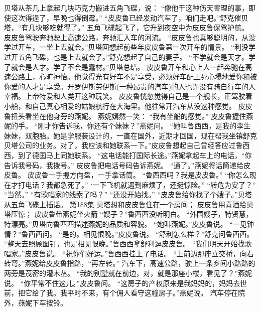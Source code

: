 \documentclass[a4paper,12pt,UTF8,twoside]{ctexbook}
\begin{document}
        贝塔从茶几上拿起几块巧克力搬进五角飞碟，说： 
        “像他干这种伤天害理的事，即使这次得逞了，早晚也得倒霉。” 
        “皮皮鲁已经发动汽车了，咱们走吧。”舒克催贝塔，“有几块够吃就得了。” 
        五角飞碟起飞了，它升到夜空中为皮皮鲁保驾护航。 
        皮皮鲁驾驶奔驰驶上高速公路，奔驰汇入车的河流。 
        “皮皮鲁也真够聪明的，从没学过开车，一坐上去就会。”贝塔回想起前些年皮皮鲁第一次开车的情景。 
        “利没学过开五角飞碟，也是上去就会了。”舒克想起了自己的妻子。 
        “不学就会是天才。学了就会是人才。学了不会是蠢材。”贝塔总结。 
        皮皮鲁开车和心上人一起奔驰在高速公路上，心旷神怡。他觉得光有好车不是享受，必须好车配上死心塌地爱你和被你爱的人才是享受。开罗伊斯劳伊斯(一种昂贵的汽车)的人也许没有骑自行车的人幸福。上帝特爱和人类开这种玩笑。 
        皮皮鲁恍忽觉得自己是一个舰长，正驾驶着小船，和自己真心相爱的姑娘航行在大海里。他往常开汽车从没这种感觉。 
        皮皮鲁扭头看坐在他身旁的燕妮。 
        燕妮嫣然一笑： 
        “我有坐船的感觉。” 
        皮皮鲁握住燕妮的手。 
        “刚才你告诉我，你还有个妹妹？”燕妮问。 
        “她叫鲁西西，是我的孪生妹妹，双胞胎。她是学服装设计的，一直在国外，近期才回国，现在帮我坐镇舒克贝塔公司的业务。对了，我应该和她联系一下。”皮皮鲁想起自己曾经答应过鲁西西，到了德国马上同她联系。 
        “这电话能打国际长途。”燕妮拿起车上的电话，“你告诉我号码，我拨号。” 
        皮皮鲁把电话号码告诉燕妮。 
        “通了。”燕妮将话筒递给皮皮鲁。 
        皮皮鲁一手握方向盘，一手拿话筒。 
        “鲁西西吗？我是皮皮鲁。” 
        “你怎么现在才打电话？我都急死了。” 
        ‘一下飞机就遇到麻烦了，还挺惊险。” 
        “转危为安了？” 
        “当然。” 
        “有歌唱家的线索了吗？” 
        “还没开始找。” 
        “皮皮鲁给你找了个嫂子。”贝塔从五角飞碟上插话。   第188集 
        贝塔想和皮皮鲁住在一个房间； 
        皮皮鲁用喜酒给贝塔压惊； 
        皮皮鲁带燕妮坐火箭   
        “嫂子？”鲁西西没听明白。 
        “外国嫂子，特贤慧，特漂亮。”贝塔向鲁西西描述燕妮的品质和容貌。 
        “她叫燕妮。”皮皮鲁说。 
        “一见钟情？”鲁西西问。 
        “是的。相见恨晚。”皮皮鲁说。 
        “舒利怎么样？”舒克问鲁西西。 
        “整天去照顾图钉，也是相见恨晚。”鲁西西拿舒利逗皮皮鲁。 
        “我们明天开始找歌唱家。”皮皮鲁说。 
        “祝你们好运。”鲁西西挂上了电话。 
        “上前边那座立交桥，向右转弯。”燕妮给皮皮鲁指路，“再左转。” 
        汽车下，高速公路，驶上一条乡间小路路的两旁是茂密的灌木丛。 
        “我的别墅就在前边，对，就是那座小楼，看见了？”燕妮说。 
        “你平常不住这儿。”皮皮鲁问。 
        “这房子的产权原来是我妈妈的，妈妈去世前，把它给了我。我平时不来，有个佣人看守这幢房子。”燕妮说。 
        汽车停在院外，燕妮下车按铃。 
\end{document}
